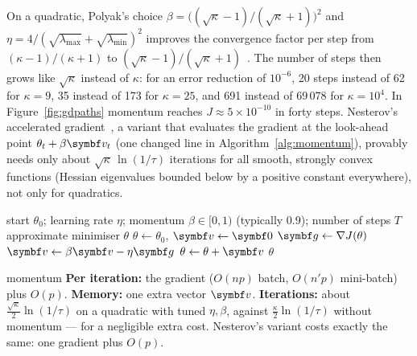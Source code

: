 \documentclass[11pt]{article}
\newcommand{\gvec}{\vect{g}}
\newcommand{\vvec}{\vect{v}}
\begin{document}
On a quadratic, Polyak's choice $\beta = \big((\sqrt\kappa - 1)/(\sqrt\kappa + 1)\big)^2$ and
$\eta = 4/(\sqrt{\lambda_{\max}} + \sqrt{\lambda_{\min}})^2$ improves the convergence factor per step from
$(\kappa - 1)/(\kappa + 1)$ to $(\sqrt\kappa - 1)/(\sqrt\kappa + 1)$~\cite{polyak1964}. The number of steps then grows
like $\sqrt\kappa$ instead of $\kappa$: for an error reduction of $10^{-6}$, 20 steps instead of 62 for $\kappa = 9$, 35
instead of 173 for $\kappa = 25$, and 691 instead of 69\,078 for $\kappa = 10^4$. In Figure~\ref{fig:gdpaths} momentum
reaches $J \approx 5 \times 10^{-10}$ in forty steps. Nesterov's accelerated gradient~\cite{nesterov1983}, a variant
that evaluates the gradient at the look-ahead point $\theta_t + \beta\vvec_t$ (one changed line in
Algorithm~\ref{alg:momentum}), provably needs only about $\sqrt\kappa\,\ln(1/\tau)$ iterations for all smooth, strongly
convex functions (Hessian eigenvalues bounded below by a positive constant everywhere), not only for quadratics.

\begin{algorithm}[H]
\caption{Gradient descent with momentum (heavy ball)}\label{alg:momentum}
\begin{algorithmic}[1]
\Require start $\theta_0$; learning rate $\eta$; momentum $\beta \in [0, 1)$ (typically $0.9$); number of steps $T$
\Ensure approximate minimiser $\theta$
  \State $\theta \gets \theta_0$, \quad $\vvec \gets \vect{0}$
    \State $\gvec \gets \nabla J(\theta)$ \Comment{or $\gvec_B$; Nesterov: $\gvec \gets \nabla J(\theta + \beta\vvec)$}
    \State $\vvec \gets \beta\vvec - \eta\gvec$ 
    \State $\theta \gets \theta + \vvec$
  \EndFor
  \State \Return $\theta$
\EndFunction
\end{algorithmic}
\end{algorithm}

\begin{runtime}{momentum}
\textbf{Per iteration:} the gradient ($O(np)$ batch, $O(n'p)$ mini-batch) plus $O(p)$. \textbf{Memory:} one extra
vector $\vvec$. \textbf{Iterations:} about $\frac{\sqrt\kappa}{2}\ln(1/\tau)$ on a quadratic with tuned
$\eta, \beta$, against $\frac{\kappa}{2}\ln(1/\tau)$ without momentum --- for a negligible extra cost. Nesterov's
variant costs exactly the same: one gradient plus $O(p)$.
\end{runtime}
\end{document}

